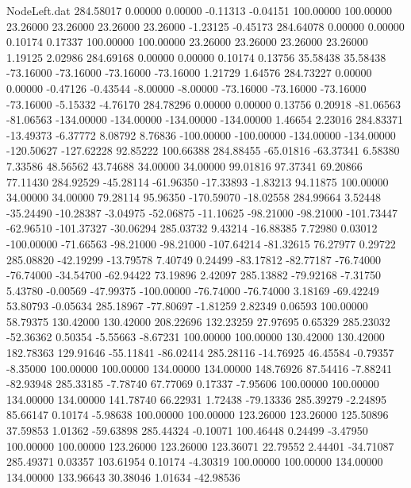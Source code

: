 \begin{filecontents}{NodeLeft.dat}
 284.58017    0.00000    0.00000    -0.11313   -0.04151  100.00000  100.00000   23.26000   23.26000   23.26000   23.26000   -1.23125   -0.45173
 284.64078    0.00000    0.00000     0.10174    0.17337  100.00000  100.00000   23.26000   23.26000   23.26000   23.26000    1.19125    2.02986
 284.69168    0.00000    0.00000     0.10174    0.13756   35.58438   35.58438  -73.16000  -73.16000  -73.16000  -73.16000    1.21729    1.64576
 284.73227    0.00000    0.00000    -0.47126   -0.43544   -8.00000   -8.00000  -73.16000  -73.16000  -73.16000  -73.16000   -5.15332   -4.76170
 284.78296    0.00000    0.00000     0.13756    0.20918  -81.06563  -81.06563 -134.00000 -134.00000 -134.00000 -134.00000    1.46654    2.23016
 284.83371  -13.49373   -6.37772     8.08792    8.76836 -100.00000 -100.00000 -134.00000 -134.00000 -120.50627 -127.62228   92.85222  100.66388
 284.88455  -65.01816  -63.37341     6.58380    7.33586   48.56562   43.74688   34.00000   34.00000   99.01816   97.37341   69.20866   77.11430
 284.92529  -45.28114  -61.96350   -17.33893   -1.83213   94.11875  100.00000   34.00000   34.00000   79.28114   95.96350 -170.59070  -18.02558
 284.99664    3.52448  -35.24490   -10.28387   -3.04975  -52.06875  -11.10625  -98.21000  -98.21000 -101.73447  -62.96510 -101.37327  -30.06294
 285.03732    9.43214  -16.88385     7.72980    0.03012 -100.00000  -71.66563  -98.21000  -98.21000 -107.64214  -81.32615   76.27977    0.29722
 285.08820  -42.19299  -13.79578     7.40749    0.24499  -83.17812  -82.77187  -76.74000  -76.74000  -34.54700  -62.94422   73.19896    2.42097
 285.13882  -79.92168   -7.31750     5.43780   -0.00569  -47.99375 -100.00000  -76.74000  -76.74000    3.18169  -69.42249   53.80793   -0.05634
 285.18967  -77.80697   -1.81259     2.82349    0.06593  100.00000   58.79375  130.42000  130.42000  208.22696  132.23259   27.97695    0.65329
 285.23032  -52.36362    0.50354    -5.55663   -8.67231  100.00000  100.00000  130.42000  130.42000  182.78363  129.91646  -55.11841  -86.02414
 285.28116  -14.76925   46.45584    -0.79357   -8.35000  100.00000  100.00000  134.00000  134.00000  148.76926   87.54416   -7.88241  -82.93948
 285.33185   -7.78740   67.77069     0.17337   -7.95606  100.00000  100.00000  134.00000  134.00000  141.78740   66.22931    1.72438  -79.13336
 285.39279   -2.24895   85.66147     0.10174   -5.98638  100.00000  100.00000  123.26000  123.26000  125.50896   37.59853    1.01362  -59.63898
 285.44324   -0.10071  100.46448     0.24499   -3.47950  100.00000  100.00000  123.26000  123.26000  123.36071   22.79552    2.44401  -34.71087
 285.49371    0.03357  103.61954     0.10174   -4.30319  100.00000  100.00000  134.00000  134.00000  133.96643   30.38046    1.01634  -42.98536

\end{filecontents}
